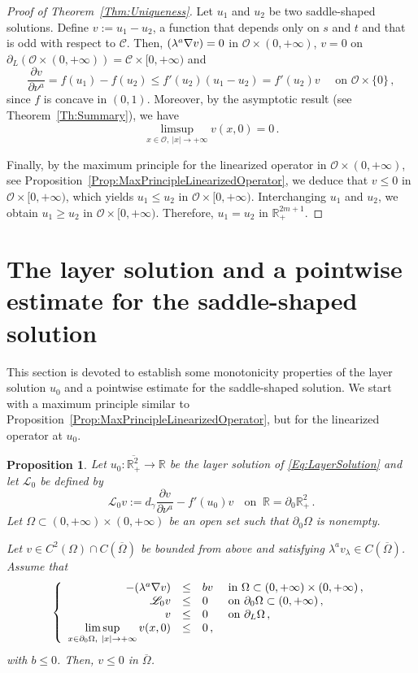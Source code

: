 \documentclass[12pt,reqno]{amsart}
\newtheorem{proposition}[theorem]{Proposition}
\theoremstyle{definition}
\theoremstyle{remark}
\newcommand{\con}[1]{\mathbb{#1}}
\newcommand{\R}{\con{R}} %
\newcommand{\ccal}{\mathscr{C}}
\newcommand{\ocal}{\mathcal{O}}
\newcommand{\s}{\gamma}
\newcommand\beqc[1]{\left\{\begin{array}{#1}}
\newcommand\eeqc{\end{array} \right.}
\def\PDEsystem{rcll}
\let\div\relax
\DeclareMathOperator{\div}{div}
\def\ds{\displaystyle}
\numberwithin{equation}{section}
\begin{document}
\begin{proof}[Proof of Theorem~\ref{Thm:Uniqueness}]
	Let $u_1$ and $u_2$ be two saddle-shaped solutions. Define $v := u_1 - u_2$, a function that depends only on $s$ and $t$ and that is odd with respect to $\ccal$. Then, $\div(\lambda^a \nabla v) = 0$ in $\ocal \times (0,+\infty)$, $v=0$ on $\partial_L \left( \ocal \times (0,+\infty) \right) = \ccal \times [0,+\infty)$ and
	$$
	\dfrac{\partial v}{\partial \nu^a} = f(u_1) - f(u_2) \leq f'(u_2) (u_1 - u_2) = f'(u_2) v \quad \textrm{ on } \ocal \times \{0\}\,,
	$$
	since $f$ is concave in $(0,1)$. Moreover, by the asymptotic result (see Theorem~\ref{Th:Summary}), we have
	$$
	\limsup_{x \in \ocal,\ |x|\to +\infty} v(x, 0) = 0\,.
	$$
	
	Finally, by the maximum principle for the linearized operator in $\ocal\times (0,+\infty)$, see Proposition~\ref{Prop:MaxPrincipleLinearizedOperator}, we deduce that $v \leq 0$ in $\ocal \times [0, +\infty)$, which yields $u_1 \leq u_2$ in $\ocal \times [0, +\infty)$. Interchanging $u_1$ and $u_2$, we obtain $u_1 \geq u_2$ in $\ocal \times [0, +\infty)$. Therefore, $u_1 = u_2$ in $\R^{2m+1}_+$.
\end{proof}


\section{The layer solution and a pointwise estimate for the saddle-shaped solution}
\label{Sec:Layer}

This section is devoted to establish some monotonicity properties of the layer solution $u_0$ and a pointwise estimate for the saddle-shaped solution. We start with a maximum principle similar to Proposition~\ref{Prop:MaxPrincipleLinearizedOperator}, but for the linearized operator at $u_0$.

\begin{proposition}
\label{Prop:MaxPrincipleLinearizedOperator2D}
Let $u_0:\overline{\R^2_+}\to \R$ be the layer solution of \eqref{Eq:LayerSolution} and let $\mathscr{L}_0$ be defined by 
$$
\mathscr{L}_0v := d_\s \dfrac{\partial v}{\partial \nu^a}  -f'(u_0) v\,\ \ \text{ on } \ \R=\partial_0\R^2_+\,.
$$
Let $\Omega \subset (0,+\infty) \times (0,+\infty)$ be an open set such that $\partial_0 \Omega$ is nonempty. 

Let $v \in C^2 (\Omega)\cap C(\overline{\Omega})$ be bounded from above and satisfying $\lambda^a v_\lambda \in C (\overline{\Omega})$. Assume that
$$
\beqc{\PDEsystem}
-\div(\lambda^a \nabla v) &\leq& b v & \text{ in } \Omega \subset (0, +\infty)\times (0,+\infty)\,, \\
\mathscr{L}_0v &\leq & 0 & \text{ on } \partial_0 \Omega \subset (0,+\infty) \,, \\
v & \leq & 0 & \text{ on } \partial_L \Omega\,,\\
\ds \limsup_{x\in \partial_0 \Omega,\ |x|\to +\infty} v(x,0) & \leq & 0\,,
\eeqc
$$
with $b \leq 0$. Then, $v\leq 0$ in $\overline{\Omega}$.
\end{proposition}
\end{document}
